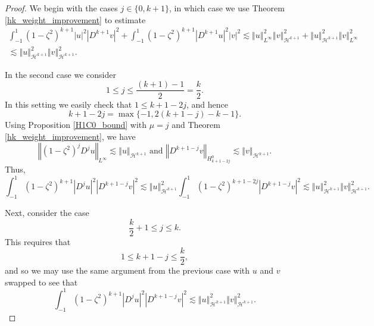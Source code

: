 \documentclass[11pt,reqno]{amsart}
\numberwithin{equation}{section}
\providecommand{\abs}[1]{\left\vert#1\right\vert}
\providecommand{\norm}[1]{\left\Vert#1\right\Vert}
\def\ls{\lesssim}
\providecommand{\abs}[1]{\left\vert#1\right\vert}
\providecommand{\norm}[1]{\left\Vert#1\right\Vert}
\def\ls{\lesssim}
\def\h{\mathcal{H}}
\begin{document}
\begin{proof}
We begin with the cases $j \in \{0,k+1\}$, in which case we use Theorem \ref{hk_weight_improvement} to estimate
\begin{multline}
 \int_{-1}^1 (1-\zeta^2)^{k+1} \abs{u}^2  \abs{D^{k+1} v}^2 +  \int_{-1}^1 (1-\zeta^2)^{k+1} \abs{D^{k+1} u}^2  \abs{ v}^2  \ls \norm{u}_{L^\infty}^2 \norm{v}_{\h^{k+1}}^2 +  \norm{u}_{\h^{k+1}}^2 \norm{v}_{L^\infty}^2 \\
 \ls \norm{u}_{\h^{k+1}}^2 \norm{v}_{\h^{k+1}}^2.
\end{multline}

In the second case we consider
\begin{equation}
 1 \le j \le \frac{(k+1)-1}{2} = \frac{k}{2}.
\end{equation}
In this setting we easily check that $1 \le k+1-2j$, and hence
\begin{equation}
 k+1-2j = \max\{-1, 2(k+1-j) -k -1\}.
\end{equation}
Using Proposition \ref{H1C0_bound} with $\mu =j$ and Theorem \ref{hk_weight_improvement}, we have 
\begin{equation}
 \norm{(1-\zeta^2)^j D^j u}_{L^\infty} \ls \norm{u}_{\h^{k+1}}  \text{ and } \norm{D^{k+1-j} v}_{H^0_{ k+1-2j }} \ls \norm{v}_{\h^{k+1}}.
\end{equation}
Thus, 
\begin{equation}
\int_{-1}^1 (1-\zeta^2)^{k+1} \abs{D^j u}^2  \abs{D^{k+1-j} v}^2 \ls \norm{u}_{\h^{k+1}}^2  \int_{-1}^1 (1-\zeta^2)^{k+1-2j}   \abs{D^{k+1-j} v}^2 \ls \norm{u}_{\h^{k+1}}^2 \norm{v}_{\h^{k+1}}^2. 
\end{equation}

Next, consider the case 
\begin{equation}
 \frac{k}{2}+1 \le j \le k.
\end{equation}
This requires that 
\begin{equation}
1 \le k+1-j \le \frac{k}{2},
\end{equation}
and so we may use the same argument from the previous case with $u$ and $v$ swapped to see that 
\begin{equation}
 \int_{-1}^1 (1-\zeta^2)^{k+1} \abs{D^j u}^2  \abs{D^{k+1-j} v}^2 \ls \norm{u}_{\h^{k+1}}^2 \norm{v}_{\h^{k+1}}^2.
\end{equation}



\end{proof}
\end{document}
